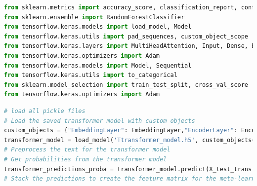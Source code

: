 \begin{tcolorbox}[colback=gray!5!white, colframe=gray!80!black, boxrule=0.5pt, title=Ensemble Model 7]
    \begin{lstlisting}[language=Python]
from sklearn.metrics import accuracy_score, classification_report, confusion_matrix
from sklearn.ensemble import RandomForestClassifier
from tensorflow.keras.models import load_model, Model
from tensorflow.keras.utils import pad_sequences, custom_object_scope
from tensorflow.keras.layers import MultiHeadAttention, Input, Dense, Embedding, GlobalAveragePooling1D, LayerNormalization, Layer
from tensorflow.keras.optimizers import Adam
from tensorflow.keras.models import Model, Sequential
from tensorflow.keras.utils import to_categorical
from sklearn.model_selection import train_test_split, cross_val_score
from tensorflow.keras.optimizers import Adam
\end{lstlisting}
\end{tcolorbox}
\begin{tcolorbox}[colback=gray!5!white, colframe=gray!80!black, boxrule=0.5pt, title=Ensemble Model 7]
    \begin{lstlisting}[language=Python]
# load all pickle files
# Load the saved transformer model with custom objects
custom_objects = {"EmbeddingLayer": EmbeddingLayer,"EncoderLayer": EncoderLayer}
transformer_model = load_model('Ttransformer_model.h5', custom_objects=custom_objects)
# Preprocess the text for the transformer model
# Get probabilities from the transformer model
transformer_predictions_proba = transformer_model.predict(X_test_transformer)
# Stack the predictions to create the feature matrix for the meta-learner
    \end{lstlisting}
\end{tcolorbox}

